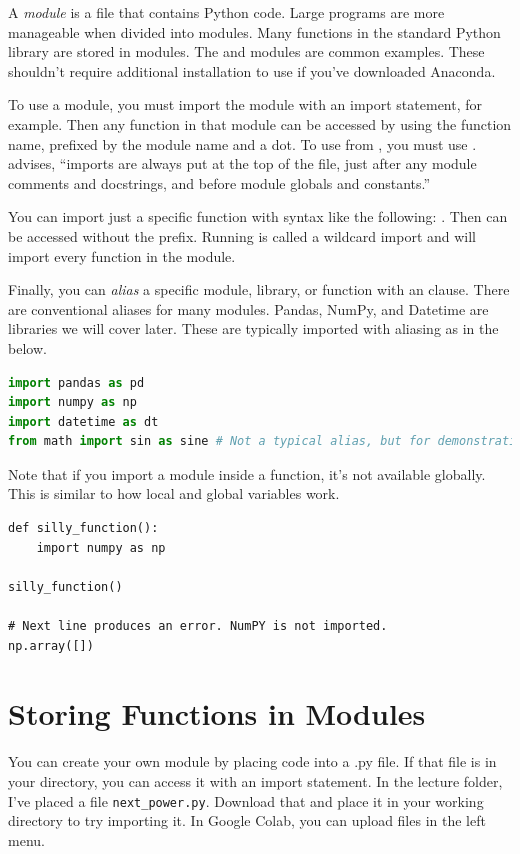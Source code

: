 
A \emph{module} is a file that contains Python code. Large programs are more manageable when divided into modules. Many functions in the standard Python library are stored in modules. The  and  modules are common examples. These shouldn't require additional installation to use if you've downloaded Anaconda. 

To use a module, you must import the module with an import statement,  for example. Then any function in that module can be accessed by using the function name, prefixed by the module name and a dot. To use  from , you must use .  advises, ``imports are always put at the top of the file, just after any module comments and docstrings, and before module globals and constants.''

You can import just a specific function with syntax like the following: . Then  can be accessed without the  prefix. Running  is called a wildcard import and will import every function in the module. 

Finally, you can \emph{alias} a specific module, library, or function with an  clause. There are conventional aliases for many modules. Pandas, NumPy, and Datetime are libraries we will cover later. These are typically imported with aliasing as in the below. 

\begin{lstlisting}[language = Python]
import pandas as pd
import numpy as np
import datetime as dt
from math import sin as sine # Not a typical alias, but for demonstration
\end{lstlisting}

Note that if you import a module inside a function, it's not available globally. This is similar to how local and global variables work. 

\begin{lstlisting}
def silly_function():
    import numpy as np

silly_function()

# Next line produces an error. NumPY is not imported.
np.array([])
\end{lstlisting}

\section{Storing Functions in Modules}
You can create your own module by placing code into a .py file. If that file is in your directory, you can access it with an import statement. In the lecture folder, I've placed a file \texttt{next\_power.py}. Download that and place it in your working directory to try importing it. In Google Colab, you can upload files in the left menu. 

